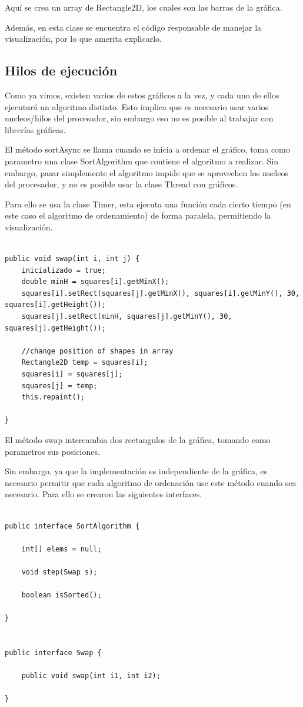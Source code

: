 \documentclass[paper=a4, fontsize=11pt]{scrartcl} %
\numberwithin{equation}{section} %
\numberwithin{figure}{section} %
\numberwithin{table}{section} %
\begin{document}
Aquí se crea un array de Rectangle2D, los cuales son las barras de la gráfica.

Además, en esta clase se encuentra el código responsable de manejar la visualización,
por lo que amerita explicarlo.

\subsection{Hilos de ejecución}

Como ya vimos, existen varios de estos gráficos a la vez, y cada uno de ellos ejecutará un algoritmo
distinto. Esto implica que es necesario usar varios nucleos/hilos del procesador, sin embargo eso no es
posible al trabajar con librerías gráficas.

El método sortAsync se llama cuando se inicia a ordenar el gráfico, toma como parametro una clase
SortAlgorithm que contiene el algoritmo a realizar. Sin embargo, pasar simplemente el algoritmo impide que
se aprovechen los nucleos del procesador, y no es posible usar la clase Thread con gráficos.

Para ello se usa la clase Timer, esta ejecuta una función cada cierto tiempo (en este caso el algoritmo
de ordenamiento) de forma paralela, permitiendo la visualización.

\begin{lstlisting}

public void swap(int i, int j) {
    inicializado = true;
    double minH = squares[i].getMinX();
    squares[i].setRect(squares[j].getMinX(), squares[i].getMinY(), 30, squares[i].getHeight());
    squares[j].setRect(minH, squares[j].getMinY(), 30, squares[j].getHeight());

    //change position of shapes in array
    Rectangle2D temp = squares[i];
    squares[i] = squares[j];
    squares[j] = temp;
    this.repaint();

}

\end{lstlisting}

El método swap intercambia dos rectangulos de la gráfica, tomando como parametros sus posiciones.

Sin embargo, ya que la implementación es independiente de la gráfica, es necesario permitir que cada
algoritmo de ordenación use este método cuando sea necesario. Para ello se crearon las siguientes
interfaces.

\begin{lstlisting}

public interface SortAlgorithm {

    int[] elems = null;

    void step(Swap s);

    boolean isSorted();

}


public interface Swap {

    public void swap(int i1, int i2);

}


\end{lstlisting}
\end{document}
